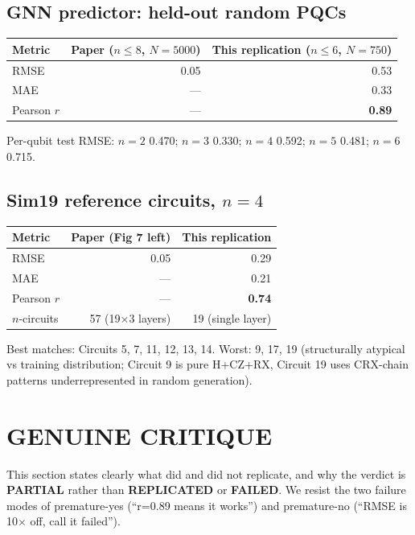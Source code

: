 \documentclass[11pt]{article}
\begin{document}
\subsection{GNN predictor: held-out random PQCs}
\begin{center}
\begin{tabular}{lrr}
\toprule
Metric & Paper (\(n\!\le\!8\), \(N\!=\!5000\)) & This replication (\(n\!\le\!6\), \(N\!=\!750\)) \\
\midrule
RMSE       & 0.05 & 0.53 \\
MAE        & --- & 0.33 \\
Pearson \(r\) & --- & \textbf{0.89} \\
\bottomrule
\end{tabular}
\end{center}

Per-qubit test RMSE: \(n\!=\!2\) 0.470; \(n\!=\!3\) 0.330; \(n\!=\!4\) 0.592;
\(n\!=\!5\) 0.481; \(n\!=\!6\) 0.715.

\subsection{Sim19 reference circuits, \(n\!=\!4\)}
\begin{center}
\begin{tabular}{lrr}
\toprule
Metric & Paper (Fig 7 left) & This replication \\
\midrule
RMSE          & 0.05 & 0.29 \\
MAE           & --- & 0.21 \\
Pearson \(r\) & --- & \textbf{0.74} \\
\(n\)-circuits & 57 (19\(\times\)3 layers) & 19 (single layer) \\
\bottomrule
\end{tabular}
\end{center}
Best matches: Circuits 5, 7, 11, 12, 13, 14. Worst: 9, 17, 19
(structurally atypical vs training distribution; Circuit 9 is pure H+CZ+RX,
Circuit 19 uses CRX-chain patterns underrepresented in random generation).

\section{GENUINE CRITIQUE}

This section states clearly what did and did not replicate, and why the
verdict is \textbf{PARTIAL} rather than \textbf{REPLICATED} or
\textbf{FAILED}. We resist the two failure modes of premature-yes
(``r=0.89 means it works'') and premature-no (``RMSE is 10\(\times\) off,
call it failed'').
\end{document}
